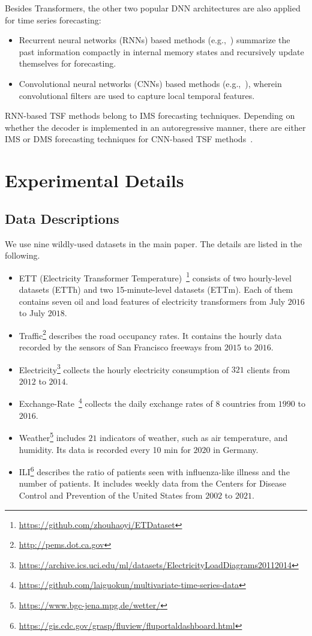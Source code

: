 \documentclass[10pt,twocolumn,letterpaper]{article}
\begin{document}
Besides Transformers, the other two popular DNN architectures are also applied for time series forecasting: 

\begin{itemize}
    \item Recurrent neural networks (RNNs) based methods (e.g.,~\cite{petnehazi2019recurrent}) summarize the past information compactly in internal memory states and recursively update themselves for forecasting. 
    \item Convolutional neural networks (CNNs) based methods (e.g.,~\cite{bai2018empirical}), wherein convolutional filters are used to capture local temporal features.
\end{itemize}

RNN-based TSF methods belong to IMS forecasting techniques. Depending on whether the decoder is implemented in an autoregressive manner, there are either IMS or DMS forecasting techniques for CNN-based TSF methods~\cite{bai2018empirical,liu2021time}. 

\section{Experimental Details}
\label{sec:supp_exp}
\subsection{Data Descriptions}
We use nine wildly-used datasets in the main paper. The details are listed in the following.
\begin{itemize}
\item ETT (Electricity Transformer Temperature)~\cite{informer}\footnote{\url{https://github.com/zhouhaoyi/ETDataset}} consists of two hourly-level datasets (ETTh) and two 15-minute-level datasets (ETTm). Each of them contains seven oil and load features of electricity transformers from July $2016$ to July $2018$.
\item Traffic\footnote{\url{http://pems.dot.ca.gov}} describes the road occupancy rates. It contains the hourly data recorded by the sensors of San Francisco freeways from $2015$ to $2016$. 
\item Electricity\footnote{\url{https://archive.ics.uci.edu/ml/datasets/ElectricityLoadDiagrams20112014}} collects the hourly electricity consumption of $321$ clients from $2012$ to $2014$.
\item Exchange-Rate~\cite{GuokunLai2017lstm}\footnote{\url{https://github.com/laiguokun/multivariate-time-series-data}} collects the daily exchange rates of $8$ countries from $1990$ to $2016$.
\item Weather\footnote{\url{https://www.bgc-jena.mpg.de/wetter/}} includes $21$ indicators of weather, such as air temperature, and humidity. Its data is recorded every 10 min for $2020$ in Germany.
\item ILI\footnote{\url{https://gis.cdc.gov/grasp/fluview/fluportaldashboard.html}} describes the ratio of patients seen with influenza-like illness and the number of patients. It includes weekly data from the Centers for Disease Control and Prevention of the United States from $2002$ to $2021$.

\end{itemize}
\end{document}
